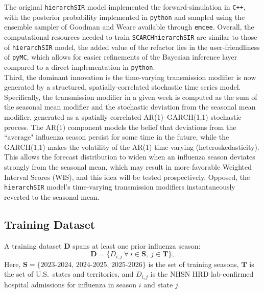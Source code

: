 \documentclass[11pt]{article}
\begin{document}
The original \texttt{hierarchSIR} model implemented the forward-simulation in \texttt{C++}, with the posterior probability implemented in \texttt{python} and sampled using the ensemble sampler of Goodman and Weare available through \texttt{emcee}. Overall, the computational resources needed to train \texttt{SCARCHhierarchSIR} are similar to those of \texttt{hierarchSIR} model, the added value of the refactor lies in the user-friendliness of \texttt{pyMC}, which allows for easier refinements of the Bayesian inference layer compared to a direct implementation in \texttt{python}.\\

Third, the dominant innovation is the time-varying transmission modifier is now generated by a structured, spatially-correlated stochastic time series model. Specifically, the transmission modifier in a given week is computed as the sum of the seasonal mean modifier and the stochastic deviation from the seasonal mean modifier, generated as a spatially correlated AR(1)--GARCH(1,1) stochastic process. The AR(1) component models the belief that deviations from the ``average" influenza season persist for some time in the future, while the GARCH(1,1) makes the volatility of the AR(1) time-varying (heteroskedasticity). This allows the forecast distribution to widen when an influenza season deviates strongly from the seasonal mean, which may result in more favorable Weighted Interval Scores (WIS), and this idea will be tested prospectively. Opposed, the \texttt{hierarchSIR} model's time-varying transmission modifiers instantaneously reverted to the seasonal mean. 

\subsection*{Training Dataset}

A training dataset $\bm{D}$ spans at least one prior influenza season:
\begin{equation}
    \bm{D} = \bigl\{ D_{i,j}\ \forall\ i \in \bm{S},\ j \in \bm{T} \bigr\},
\end{equation}
Here, $\bm{S} = \{2023\text{-}2024,\, 2024\text{-}2025,\, 2025\text{-}2026\}$ is the set of training seasons, $\bm{T}$ is the set of U.S.\ states and territories, and $D_{i,j}$ is the NHSN HRD lab-confirmed hospital admissions for influenza in season $i$ and state $j$.
\end{document}
